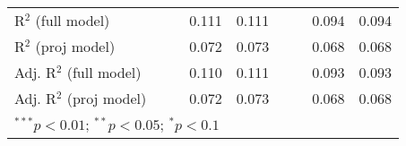 \begin{sidewaystable}[h]
\begin{center}
{\begin{tabular}{l S[table-format=6.6] S[table-format=6.6] S[table-format=6.6] S[table-format=6.6] S[table-format=6.6] S[table-format=6.6] S[table-format=6.6] S[table-format=6.6]}
R$^2$ (full model)                  &              &              & 0.111        & 0.111        &              &              & 0.094        & 0.094        \\
R$^2$ (proj model)                  &              &              & 0.072        & 0.073        &              &              & 0.068        & 0.068        \\
Adj. R$^2$ (full model)             &              &              & 0.110        & 0.111        &              &              & 0.093        & 0.093        \\
Adj. R$^2$ (proj model)             &              &              & 0.072        & 0.073        &              &              & 0.068        & 0.068        \\
\bottomrule
{}
\end{tabular}}
\label{reg1}
\end{center}
\end{sidewaystable}
